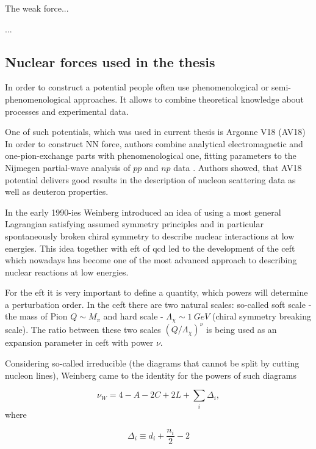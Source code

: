 The weak force...

...  

\subsection*{Nuclear forces used in the thesis}

In order to construct a potential people often use phenomenological
or semi-phenomenological approaches. It allows to combine
theoretical knowledge about processes and experimental data.

One of such potentials, which was used in current thesis is Argonne V18 (AV18) \cite{AV18Wiringa} 
In order to construct NN force, authors combine
analytical electromagnetic and one-pion-exchange parts
with phenomenological one, fitting parameters to
the Nijmegen partial-wave analysis of $pp$ and $np$ data \cite{NijmegenPhysRevC.48.792}. 
Authors showed, that AV18 potential delivers good results
in the description of nucleon scattering data as well as deuteron 
properties. 


In the early 1990-ies Weinberg \cite{WEINBERG1990,WEINBERG1991} introduced 
an idea of using a most general Lagrangian
satisfying assumed symmetry principles and in particular
spontaneously broken chiral symmetry to 
describe nuclear interactions at low energies.
This idea together with \gls*{eft} of \gls*{qcd} 
led to the development of the \gls*{ceft}
which nowadays has become one of the most advanced approach to
describing nuclear reactions at low energies.
 
For the \gls*{eft} it is very important to 
define a quantity, which powers will determine a perturbation order.
In the \gls*{ceft} there are two natural scales: so-called soft scale -
the mass of Pion $Q \sim M_\pi$ and hard scale -
$\Lambda_\chi \sim 1~GeV$ (chiral symmetry breaking scale).
The ratio between these two scales $(Q/\Lambda_\chi)^\nu$
is being used as an expansion parameter in  \gls*{ceft} with power
$\nu$.

Considering so-called irreducible (the diagrams that cannot be split
by cutting nucleon lines), Weinberg \cite{WEINBERG1990,WEINBERG1991}
came to the identity for the powers of such diagrams

\begin{equation}
    \nu_W = 4 - A - 2C + 2L + \sum_i \Delta_i,
    \label{powers}
\end{equation}
where

\begin{equation}
    \Delta_i \equiv d_i + \frac{n_i}{2} - 2
    \label{Delta}
\end{equation}

